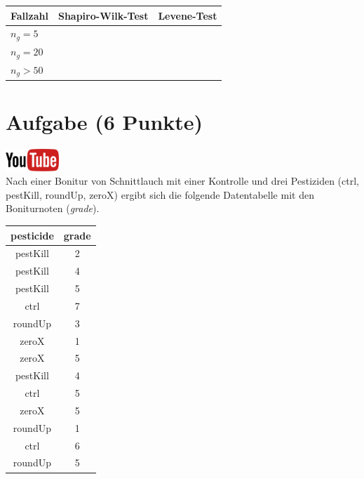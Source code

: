 \documentclass[a4paper, 10pt]{scrartcl}\usepackage[]{graphicx}\usepackage[]{xcolor}
\begin{document}
\begin{center}
  \large
  \begin{tabular}[c]{l|c|c}
  Fallzahl  & Shapiro-Wilk-Test & Levene-Test \strut\\ 
    \hline
    \textbf{$n_g = 5$} & \hspace{4cm} & \hspace{4cm} \strut\\
    \hline
    \textbf{$n_g = 20$} & \hspace{4cm} & \hspace{4cm} \strut\\
    \hline
    \textbf{$n_g > 50$} & \hspace{4cm} & \hspace{4cm} \strut\\
    \hline
  \end{tabular}
\end{center} 
\clearpage

\section{Aufgabe \hfill (6 Punkte)}

\hfill\href{https://youtu.be/knAziLLQGb0}{\includegraphics[width =
  2cm]{img/youtube}}\\[1Ex]

Nach einer Bonitur von Schnittlauch mit einer Kontrolle und drei Pestiziden (ctrl, pestKill, roundUp, zeroX) ergibt sich die folgende Datentabelle mit den Boniturnoten (\textit{grade}). 

\begin{table}[!h]
\centering
\begin{tabular}{cc}
\toprule
pesticide & grade\\
\midrule
pestKill & 2\\
pestKill & 4\\
pestKill & 5\\
ctrl & 7\\
roundUp & 3\\
\addlinespace
zeroX & 1\\
zeroX & 5\\
pestKill & 4\\
ctrl & 5\\
zeroX & 5\\
\addlinespace
roundUp & 1\\
ctrl & 6\\
roundUp & 5\\
\bottomrule
\end{tabular}
\end{table}
\end{document}
